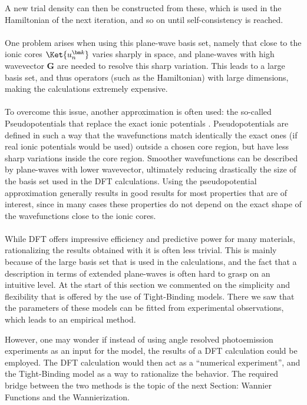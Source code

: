 A new trial density can then be constructed from these, which is used in the Hamiltonian of the next iteration, and so on until self-consistency is reached.
\\\\
One problem arises when using this plane-wave basis set, namely that close to the ionic cores $\Ket{u_n^{\bm k}}$ varies sharply in space, and plane-waves with high wavevector $\bm G$ are needed to resolve this sharp variation.
This leads to a large basis set, and thus operators (such as the Hamiltonian) with large dimensions, making the calculations extremely expensive.
\\\\
To overcome this issue, another approximation is often used: the so-called Pseudopotentials that replace the exact ionic potentials \cite{Hamann1979,Louie1982,Vanderbilt1990,Joubert1999}.
Pseudopotentials are defined in such a way that the wavefunctions match identically the exact ones (if real ionic potentials would be used) outside a chosen core region, but have less sharp variations inside the core region.
Smoother wavefunctions can be described by plane-waves with lower wavevector, ultimately reducing drastically the size of the basis set used in the DFT calculations.
Using the pseudopotential approximation generally results in good results for most properties that are of interest, since in many cases these properties do not depend on the exact shape of the wavefunctions close to the ionic cores.
\\\\
While DFT offers impressive efficiency and predictive power for many materials, rationalizing the results obtained with it is often less trivial.
This is mainly because of the large basis set that is used in the calculations, and the fact that a description in terms of extended plane-waves is often hard to grasp on an intuitive level.
At the start of this section we commented on the simplicity and flexibility that is offered by the use of Tight-Binding models.
There we saw that the parameters of these models can be fitted from experimental observations, which leads to an empirical method.

However, one may wonder if instead of using angle resolved photoemission experiments as an input for the model, the results of a DFT calculation could be employed.
The DFT calculation would then act as a ``numerical experiment'', and the Tight-Binding model as a way to rationalize the behavior.
The required bridge between the two methods is the topic of the next Section: Wannier Functions and the Wannierization. 

